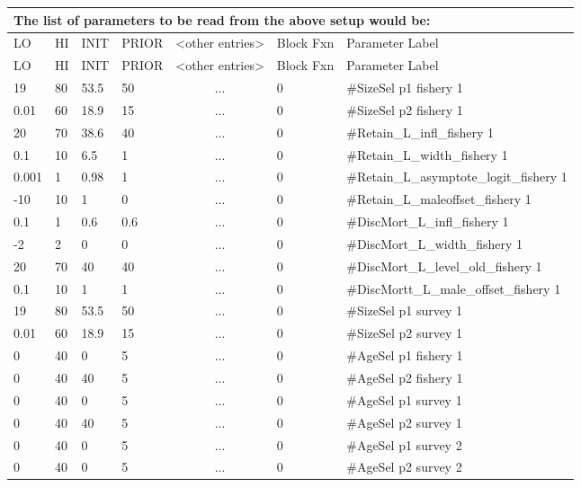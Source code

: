 \begin{longtable}{p{1cm} p{1cm} p{1cm}  p{1.5cm}  p{2.9cm}  p{1.9cm}  p{4.2cm}}
	\multicolumn{7}{l}{The list of parameters to be read from the above setup would be:}\\
	\hline
	LO \Tstrut & HI & INIT & PRIOR &  <other entries> & Block Fxn & Parameter Label\Bstrut\\
	\hline
	\endfirsthead

	\hline
	LO \Tstrut & HI & INIT & PRIOR & <other entries> & Block Fxn & Parameter Label\Bstrut\\
	\hline
	\endhead
		
	19    & 80   & 53.5 & 50  & \multicolumn{1}{c}{...}  & 0   & \#SizeSel p1 fishery 1\Tstrut\\
	0.01  & 60   & 18.9 & 15  & \multicolumn{1}{c}{...}  & 0   & \#SizeSel p2 fishery 1 \\
	20    & 70   & 38.6 & 40  & \multicolumn{1}{c}{...}  & 0   & \#Retain\_L\_infl\_fishery 1\\
	0.1   & 10   & 6.5  & 1   & \multicolumn{1}{c}{...}  & 0   & \#Retain\_L\_width\_fishery 1\\
	0.001 & 1    & 0.98 & 1   & \multicolumn{1}{c}{...}  & 0   & \#Retain\_L\_asymptote\_logit\_fishery 1\\
	-10   & 10   & 1    & 0   & \multicolumn{1}{c}{...}  & 0   & \#Retain\_L\_maleoffset\_fishery 1\\
	0.1   & 1    & 0.6  & 0.6 & \multicolumn{1}{c}{...}  & 0   & \#DiscMort\_L\_infl\_fishery 1\\
	-2    & 2    & 0    & 0   & \multicolumn{1}{c}{...}  & 0   & \#DiscMort\_L\_width\_fishery 1\\
	20    & 70   & 40   & 40  & \multicolumn{1}{c}{...}  & 0   & \#DiscMort\_L\_level\_old\_fishery 1\\
	0.1   & 10   & 1    & 1   & \multicolumn{1}{c}{...}  & 0   & \#DiscMortt\_L\_male\_offset\_fishery 1\\
	19    & 80   & 53.5 & 50  & \multicolumn{1}{c}{...}  & 0   & \#SizeSel p1 survey 1\\
	0.01  & 60   & 18.9 & 15  & \multicolumn{1}{c}{...}  & 0   & \#SizeSel p2 survey 1 \\
	0     & 40   & 0    & 5   & \multicolumn{1}{c}{...}  & 0   & \#AgeSel p1 fishery 1\\
	0     & 40   & 40   & 5   & \multicolumn{1}{c}{...}  & 0   & \#AgeSel p2 fishery 1\\
	0     & 40   & 0    & 5   & \multicolumn{1}{c}{...}  & 0   & \#AgeSel p1 survey 1\\
	0     & 40   & 40   & 5   & \multicolumn{1}{c}{...}  & 0   & \#AgeSel p2 survey 1\\
	0     & 40   & 0    & 5   & \multicolumn{1}{c}{...}  & 0   & \#AgeSel p1 survey 2\\
	0     & 40   & 0    & 5   & \multicolumn{1}{c}{...}  & 0   & \#AgeSel p2 survey 2\Bstrut\\
	\hline
\end{longtable}


